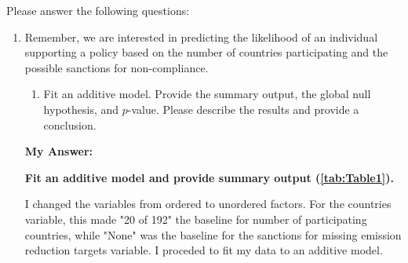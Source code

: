 \documentclass[12pt,letterpaper]{article}
\begin{document}
\newpage
\noindent Please answer the following questions:

\begin{enumerate}
	\item
	Remember, we are interested in predicting the likelihood of an individual supporting a policy based on the number of countries participating and the possible sanctions for non-compliance.
	\begin{enumerate}
		\item [] Fit an additive model. Provide the summary output, the global null hypothesis, and $p$-value. Please describe the results and provide a conclusion.

	\end{enumerate}
	
\noindent\textbf{My Answer:}

	\textbf{Fit an additive model and provide summary output (\autoref{tab:Table1}).}

	I changed the variables from ordered to unordered factors. For the countries variable, this made "20 of 192" the baseline for number of participating countries, while "None" was the baseline for the sanctions for missing emission reduction targets variable. I proceded to fit my data to an additive model.
	
	
	

\end{enumerate}
\end{document}
